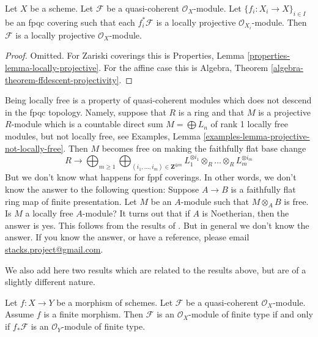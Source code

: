 \begin{lemma}
\label{lemma-locally-projective-descends}
Let $X$ be a scheme.
Let $\mathcal{F}$ be a quasi-coherent $\mathcal{O}_X$-module.
Let $\{f_i : X_i \to X\}_{i \in I}$ be an fpqc covering such that
each $f_i^*\mathcal{F}$ is a locally projective $\mathcal{O}_{X_i}$-module.
Then $\mathcal{F}$ is a locally projective $\mathcal{O}_X$-module.
\end{lemma}

\begin{proof}
Omitted. For Zariski coverings this is
Properties, Lemma \ref{properties-lemma-locally-projective}.
For the affine case this is
Algebra, Theorem \ref{algebra-theorem-ffdescent-projectivity}.
\end{proof}

\begin{remark}
\label{remark-locally-free-descends}
Being locally free is a property of quasi-coherent modules which
does not descend in the fpqc topology. Namely, suppose that
$R$ is a ring and that $M$ is a projective $R$-module which is
a countable direct sum $M = \bigoplus L_n$ of rank 1 locally
free modules, but not locally free, see
Examples, Lemma \ref{examples-lemma-projective-not-locally-free}.
Then $M$ becomes free on making the faithfully flat base change
$$
R \longrightarrow
\bigoplus\nolimits_{m \geq 1}
\bigoplus\nolimits_{(i_1, \ldots, i_m) \in \mathbf{Z}^{\oplus m}}
L_1^{\otimes i_1} \otimes_R \ldots \otimes_R L_m^{\otimes i_m}
$$
But we don't know what happens for fppf coverings. In other words,
we don't know the answer to the following question:
Suppose $A \to B$ is a faithfully
flat ring map of finite presentation. Let $M$ be an $A$-module
such that $M \otimes_A B$ is free. Is $M$ a locally free
$A$-module? It turns out that if $A$ is Noetherian, then the answer
is yes. This follows from the results of \cite{Bass}. But in general
we don't know the answer. If you know the answer, or have a reference,
please email
\href{mailto:stacks.project@gmail.com}{stacks.project@gmail.com}.
\end{remark}

\noindent
We also add here two results which are related to the results above, but
are of a slightly different nature.

\begin{lemma}
\label{lemma-finite-over-finite-module}
Let $f : X \to Y$ be a morphism of schemes.
Let $\mathcal{F}$ be a quasi-coherent $\mathcal{O}_X$-module.
Assume $f$ is a finite morphism.
Then $\mathcal{F}$ is an $\mathcal{O}_X$-module of finite type
if and only if $f_*\mathcal{F}$ is an $\mathcal{O}_Y$-module of finite
type.
\end{lemma}

